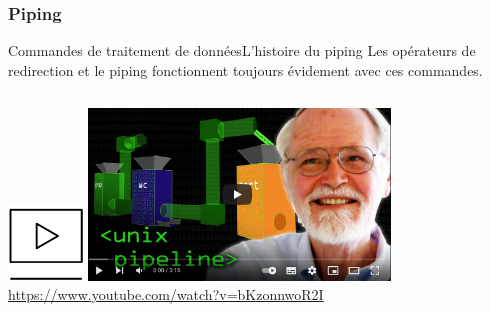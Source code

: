 \documentclass{beamer}
\begin{document}
    \subsubsection{Piping}\label{subsubsec:piping}
    \begin{frame}{Commandes de traitement de données}{L'histoire du piping}
        Les opérateurs de redirection et le piping fonctionnent toujours évidement avec ces commandes.
        \bigbreak
        \begin{columns}
            \centering
            \includegraphics[width=2cm]{image/video}
            \includegraphics[width=8cm]{image/kernighan-piping-video} \\ \url{https://www.youtube.com/watch?v=bKzonnwoR2I} \\
        \end{columns}
    \end{frame}
\end{document}
